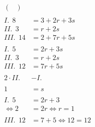\documentclass[12pt,a4paper]{report}
\begin{document}
\begin{align*}
\begin{pmatrix}
		\end{pmatrix} \\\\
		I.\ \ 8 &= 3 + 2r + 3s \\
		II.\ \ 3 &= r + 2s \\
		III.\ \ 14 &= 2 + 7r + 5s \\
		\\
		I.\ \ 5 &= 2r + 3s \\
		II.\ \ 3 &= r + 2s \\
		III.\ \ 12 &= 7r + 5s \\
		\\
		2\cdot II. &- I. \\\\
		1 &= s \\\\
		I.\ \ 5 &= 2r + 3 \\
		\Leftrightarrow 2 &= 2r \Leftrightarrow r = 1 \\\\
		III.\ \ 12 &= 7 + 5 \Leftrightarrow 12 = 12 \\
	\end{align*}
\end{document}
